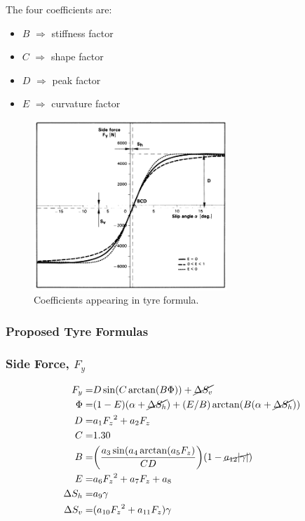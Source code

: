 \documentclass{beamer}
\begin{document}
\begin{frame}
	The four coefficients are:
	\begin{itemize}
		\item $B$ $\Rightarrow$ stiffness factor
		\item $C$ $\Rightarrow$ shape factor
		\item $D$ $\Rightarrow$ peak factor
		\item $E$ $\Rightarrow$ curvature factor
	\end{itemize}
	\begin{figure}
		\centering
		\includegraphics[width=0.65\textwidth,keepaspectratio]{images/Coefficients-Appearing-In-Tyre_Formula.pdf}
		\caption{Coefficients appearing in tyre formula.}
		\label{fig_03:coefficients-appearing-in-tyre_formula}
	\end{figure}
\end{frame}

\subsubsection{Proposed Tyre Formulas}
\begin{frame}
	\frametitle{Side Force, $F_y$}
	\begin{subequations}
		\begin{align}
		\label{eqn:tire_model_side_force}  
		F_y =& D\sin(C\arctan(B\Phi))  + \cancel{\Delta{S_v}} \\
		\Phi =& (1-E)(\alpha+\cancel{\Delta{S_h}})+(E/B)\arctan(B(\alpha+\cancel{\Delta{S_h}})) \\
		D =& a_1{F_z}^2 + a_2{F_z}\\
		C =& 1.30 \\
		B =& \bigg(\frac{a_3\sin(a_4\arctan(a_5F_z)}{CD}\bigg)(1-\cancel{a_{12}|\gamma|})\\
		E =& a_6{F_z}^{2} + a_7{F_z} + a_8 \\
		\Delta{S_h} =& a_9\gamma \\
		\Delta{S_v} =& (a_{10}{F_z}^{2}+ a_{11}F_z)\gamma
		\end{align}
	\end{subequations} 
\end{frame}
\end{document}
